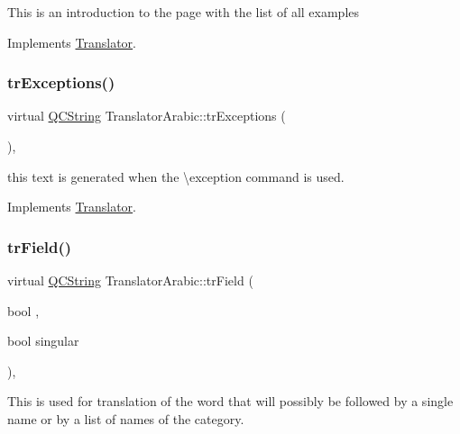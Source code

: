 This is an introduction to the page with the list of all examples 

Implements \mbox{\hyperlink{class_translator}{Translator}}.

\mbox{\label{class_translator_arabic_a6eabaaa6157a6ebd1ddccca45d2b42c2}} 
\subsubsection{\texorpdfstring{trExceptions()}{trExceptions()}}
{\footnotesize\ttfamily virtual \mbox{\hyperlink{class_q_c_string}{Q\+C\+String}} Translator\+Arabic\+::tr\+Exceptions (\begin{DoxyParamCaption}{ }\end{DoxyParamCaption})\hspace{0.3cm}{\ttfamily [inline]}, {\ttfamily [virtual]}}

this text is generated when the \textbackslash{}exception command is used. 

Implements \mbox{\hyperlink{class_translator}{Translator}}.

\mbox{\label{class_translator_arabic_a50484f8c4f445796aa3e473c7c90a5df}} 
\subsubsection{\texorpdfstring{trField()}{trField()}}
{\footnotesize\ttfamily virtual \mbox{\hyperlink{class_q_c_string}{Q\+C\+String}} Translator\+Arabic\+::tr\+Field (\begin{DoxyParamCaption}\item[{bool}]{,  }\item[{bool}]{singular }\end{DoxyParamCaption})\hspace{0.3cm}{\ttfamily [inline]}, {\ttfamily [virtual]}}

This is used for translation of the word that will possibly be followed by a single name or by a list of names of the category. \mbox{\label{class_translator_arabic_aca6144fb44b8cfcf13db8c5bc91a4557}} 
